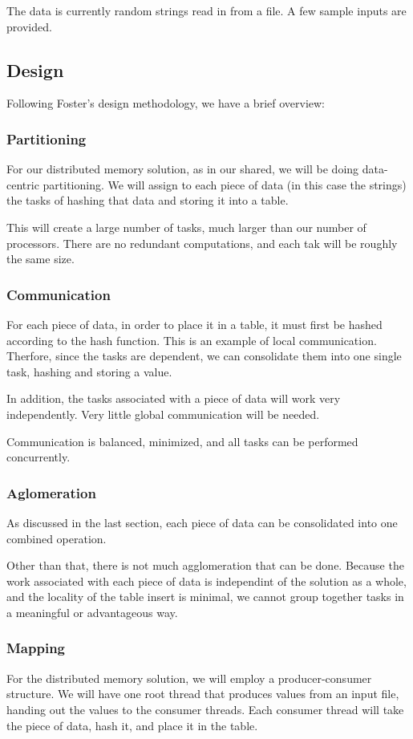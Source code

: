 \documentclass{article}
\begin{document}
The data is currently random strings read in from a file. A few sample inputs are provided.

\subsection{Design}
Following Foster's design methodology, we have a brief overview:

\subsubsection{Partitioning}
For our distributed memory solution, as in our shared, we will be doing data-centric partitioning. We will assign to each piece of data (in this case the strings) the tasks of hashing that data and storing it into a table. 

This will create a large number of tasks, much larger than our number of processors. There are no redundant computations, and each tak will be roughly the same size.

\subsubsection{Communication}
For each piece of data, in order to place it in a table, it must first be hashed according to the hash function. This is an example of local communication. Therfore, since the tasks are dependent, we can consolidate them into one single task, hashing and storing a value.

In addition, the tasks associated with a piece of data will work very independently. Very little global communication will be needed.

Communication is balanced, minimized, and all tasks can be performed concurrently.

\subsubsection{Aglomeration}
As discussed in the last section, each piece of data can be consolidated into one combined operation.

Other than that, there is not much agglomeration that can be done. Because the work associated with each piece of data is independint of the solution as a whole, and the locality of the table insert is minimal, we cannot group together tasks in a meaningful or advantageous way.

\subsubsection{Mapping}
For the distributed memory solution, we will employ a producer-consumer structure. We will have one root thread that produces values from an input file, handing out the values to the consumer threads. Each consumer thread will take the piece of data, hash it, and place it in the table.
\end{document}
